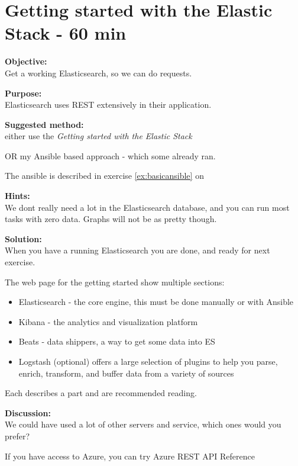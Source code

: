 \documentclass[a4paper,11pt,notitlepage]{report}
\begin{document}
\chapter{Getting started with the Elastic Stack - 60 min}
\label{ex:dateformats}


{\bf Objective:}\\
Get a working Elasticsearch, so we can do requests.

{\bf Purpose:}\\
Elasticsearch uses REST extensively in their application.

{\bf Suggested method:}\\
either use the
\emph{Getting started with the Elastic Stack}

OR my Ansible based approach - which some already ran.

The ansible is described in exercise \ref{ex:basicansible} on \pageref{ex:basicansible}

{\bf Hints:}\\
We dont really need a lot in the Elasticsearch database, and you can run most tasks with zero data. Graphs will not be as pretty though.

{\bf Solution:}\\
When you have a running Elasticsearch you are done, and ready for next exercise.

The web page for the getting started show multiple sections:
\begin{itemize}
\item Elasticsearch - the core engine, this must be done manually or with Ansible
\item Kibana - the analytics and visualization platform
\item Beats - data shippers, a way to get some data into ES
\item Logstash (optional) offers a large selection of plugins to help you parse, enrich, transform, and buffer data from a variety of sources
\end{itemize}

Each describes a part and are recommended reading.

{\bf Discussion:}\\
We could have used a lot of other servers and service, which ones would you prefer?

If you have access to Azure, you can try Azure REST API Reference\\ 
\end{document}
